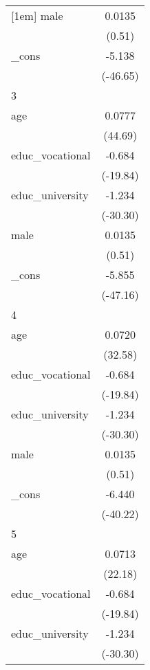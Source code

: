 {\begin{tabular}{l*{1}{c}}
[1em]
male        &      0.0135         \\
            &      (0.51)         \\
[1em]
\_cons      &      -5.138\sym{***}\\
            &    (-46.65)         \\
\hline
3           &                     \\
age         &      0.0777\sym{***}\\
            &     (44.69)         \\
[1em]
educ\_vocational&      -0.684\sym{***}\\
            &    (-19.84)         \\
[1em]
educ\_university&      -1.234\sym{***}\\
            &    (-30.30)         \\
[1em]
male        &      0.0135         \\
            &      (0.51)         \\
[1em]
\_cons      &      -5.855\sym{***}\\
            &    (-47.16)         \\
\hline
4           &                     \\
age         &      0.0720\sym{***}\\
            &     (32.58)         \\
[1em]
educ\_vocational&      -0.684\sym{***}\\
            &    (-19.84)         \\
[1em]
educ\_university&      -1.234\sym{***}\\
            &    (-30.30)         \\
[1em]
male        &      0.0135         \\
            &      (0.51)         \\
[1em]
\_cons      &      -6.440\sym{***}\\
            &    (-40.22)         \\
\hline
5           &                     \\
age         &      0.0713\sym{***}\\
            &     (22.18)         \\
[1em]
educ\_vocational&      -0.684\sym{***}\\
            &    (-19.84)         \\
[1em]
educ\_university&      -1.234\sym{***}\\
            &    (-30.30)         \\

\end{tabular}}
